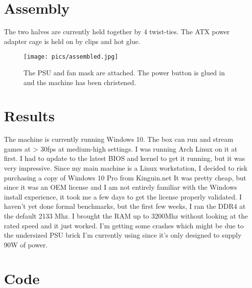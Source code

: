\documentclass{article}
\begin{document}
\section{Assembly}
The two halves are currently held together by 4 twist-ties. The ATX power adapter cage is held on by clips and hot glue.

\begin{figure}[h]
\texttt{[image: pics/assembled.jpg]}
\caption{The PSU and fan mask are attached. The power button is glued in and the machine has been christened.}
\end{figure}

\section{Results}
The machine is currently running Windows 10. The box can run and stream games at > 30fps at medium-high settings. I was running Arch Linux on it at first. I had to update to the latest BIOS and kernel to get it running, but it was very impressive. Since my main machine is a Linux workstation, I decided to risk purchasing a copy of Windows 10 Pro from Kinguin.net It was pretty cheap, but since it was an OEM license and I am not entirely familiar with the Windows install experience, it took me a few days to get the license properly validated. I haven't yet done formal benchmarks, but the first few weeks, I ran the DDR4 at the default 2133 Mhz. I brought the RAM up to 3200Mhz without looking at the rated speed and it just worked. I'm getting some crashes which might be due to the undersized PSU brick I'm currently using since it's only designed to supply 90W of power.

\section{Code}

\end{document}
